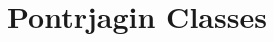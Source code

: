 \documentclass[../main]{subfiles}
\begin{document}
\chapter{Pontrjagin Classes}\label{ch:15}

\setlength{\headheight}{22.48724pt}

\setlength{\headheight}{12.0pt}
\end{document}
